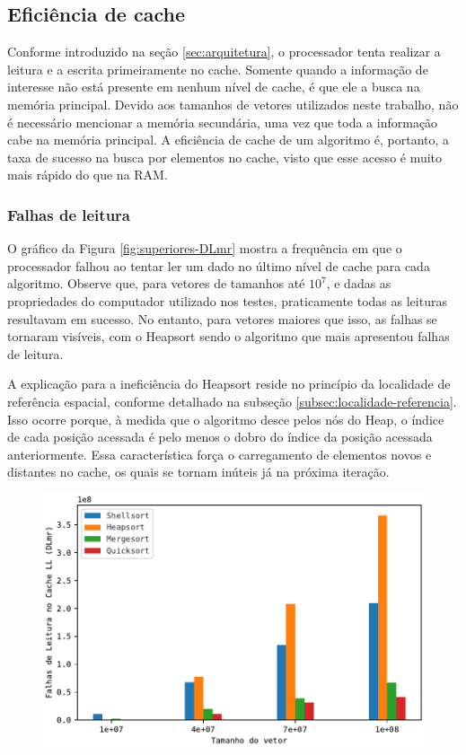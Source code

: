 \subsection{Eficiência de cache}\label{subsec:sup-cache}
Conforme introduzido na seção \ref{sec:arquitetura}, o processador tenta realizar a leitura e a escrita primeiramente no cache. Somente quando a informação de interesse não está presente em nenhum nível de cache, é que ele a busca na memória principal. Devido aos tamanhos de vetores utilizados neste trabalho, não é necessário mencionar a memória secundária, uma vez que toda a informação cabe na memória principal. A eficiência de cache de um algoritmo é, portanto, a taxa de sucesso na busca por elementos no cache, visto que esse acesso é muito mais rápido do que na RAM.

\subsubsection{Falhas de leitura}
O gráfico da Figura \ref{fig:superiores-DLmr} mostra a frequência em que o processador falhou ao tentar ler um dado no último nível de cache para cada algoritmo. Observe que, para vetores de tamanhos até $10^7$, e dadas as propriedades do computador utilizado nos testes, praticamente todas as leituras resultavam em sucesso. No entanto, para vetores maiores que isso, as falhas se tornaram visíveis, com o Heapsort sendo o algoritmo que mais apresentou falhas de leitura.

A explicação para a ineficiência do Heapsort reside no princípio da localidade de referência espacial, conforme detalhado na subseção \ref{subsec:localidade-referencia}. Isso ocorre porque, à medida que o algoritmo desce pelos nós do Heap, o índice de cada posição acessada é pelo menos o dobro do índice da posição acessada anteriormente. Essa característica força o carregamento de elementos novos e distantes no cache, os quais se tornam inúteis já na próxima iteração.

\begin{figure}[H]
    \centering
    \includegraphics[scale=0.787]{figuras/pdf/superiores_DLmr.pdf}
\end{figure}

